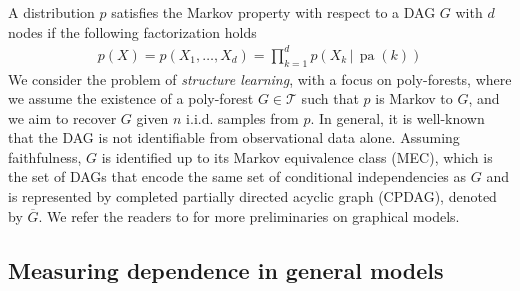\documentclass{article}
\theoremstyle{definition}
\theoremstyle{definition}
\theoremstyle{definition}
\theoremstyle{definition}
\theoremstyle{definition}
\theoremstyle{definition}
\theoremstyle{remark}
\theoremstyle{remark}
\newcommand{\given}{\,|\,}
\DeclareMathOperator{\pa}{pa}
\newcommand{\mec}{\overline{G}}
\newcommand{\pltr}{\mathcal{T}}
\begin{document}
A distribution $p$ satisfies the Markov property with respect to a DAG $G$ with $d$ nodes if the following factorization holds
\begin{align*}
    p(X) = p(X_1, \dots, X_d) = \prod_{k=1}^d p(X_k \given \pa(k))
\end{align*}
We consider the problem of \emph{structure learning}, with a focus on poly-forests, where we assume the existence of a poly-forest $G\in\pltr$ such that $p$ is Markov to $G$, and we aim to recover $G$ given $n$ i.i.d. samples from $p$.
In general, it is well-known that the DAG is not identifiable from observational data alone. Assuming faithfulness, $G$ is identified up to its Markov equivalence class (MEC), which is the set of DAGs that encode the same set of conditional independencies as $G$ and is represented by completed partially directed acyclic graph (CPDAG), denoted by $\mec$. We refer the readers to \citet{koller2009probabilistic} for more preliminaries on graphical models. 

\subsection{Measuring dependence in general models}
\end{document}
